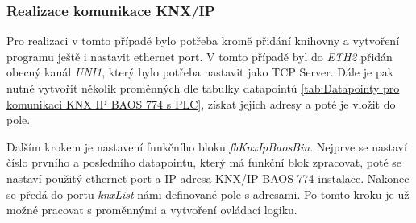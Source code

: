 \subsubsection{Realizace komunikace KNX/IP}
Pro realizaci v tomto případě bylo potřeba kromě přidání knihovny a vytvoření programu ještě i nastavit ethernet port. V tomto případě byl do \textit{ETH2} přidán obecný kanál \textit{UNI1}, který bylo potřeba nastavit jako TCP Server. Dále je pak nutné vytvořit několik proměnných dle tabulky datapointů \ref{tab:Datapointy pro komunikaci KNX IP BAOS 774 s PLC}, získat jejich adresy a poté je vložit do pole.

Dalším krokem je nastavení funkčního bloku \textit{fbKnxIpBaosBin}. Nejprve se nastaví číslo prvního a posledního datapointu, který má funkční blok zpracovat, poté se nastaví použitý ethernet port a IP adresa KNX/IP BAOS 774 instalace. Nakonec se předá do portu \textit{knxList} námi definované pole s adresami. Po tomto kroku je už možné pracovat s proměnnými a vytvoření ovládací logiku.

